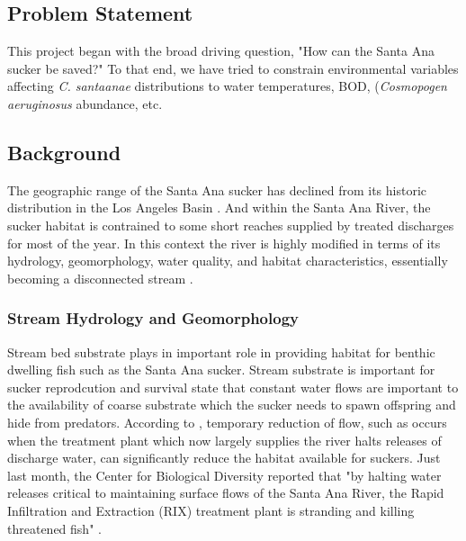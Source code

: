 \documentclass{article}\usepackage[]{graphicx}\usepackage[]{color}
\begin{document}
\subsection{Problem Statement}

This project began with the broad driving question, "How can the Santa Ana sucker be saved?" To that end, we have tried to constrain environmental variables affecting \emph{C. santaanae} distributions to water temperatures, BOD, (\emph{Cosmopogen aeruginosus} abundance, etc. 

\subsection{Background}

The geographic range of the Santa Ana sucker has declined from its historic distribution in the Los Angeles Basin \citep{brown2005aquatic, saiki2007life}. And within the Santa Ana River, the sucker habitat is contrained to some short reaches supplied by treated discharges for most of the year. In this context the river is highly modified in terms of its hydrology, geomorphology, water quality, and habitat characteristics, essentially becoming a disconnected stream \citep{poole2002fluvial}. 

\subsubsection{Stream Hydrology and Geomorphology}

Stream bed substrate plays in important role in providing habitat for benthic dwelling fish such as the Santa Ana sucker. Stream substrate is important for sucker reprodcution and survival \citet{saiki2007life, baskerville2012recovery} state that constant water flows are important to the availability of coarse substrate which the sucker needs to spawn offspring and hide from predators. According to \citet{evans2005long}, temporary reduction of flow, such as occurs when the treatment plant which now largely supplies the river halts releases of discharge water, can significantly reduce the habitat available for suckers. Just last month, the Center for Biological Diversity reported that "by halting water releases critical to maintaining surface flows of the Santa Ana River, the Rapid Infiltration and Extraction (RIX) treatment plant is stranding and killing threatened fish" \citep{evans2005draft}. 
\end{document}
